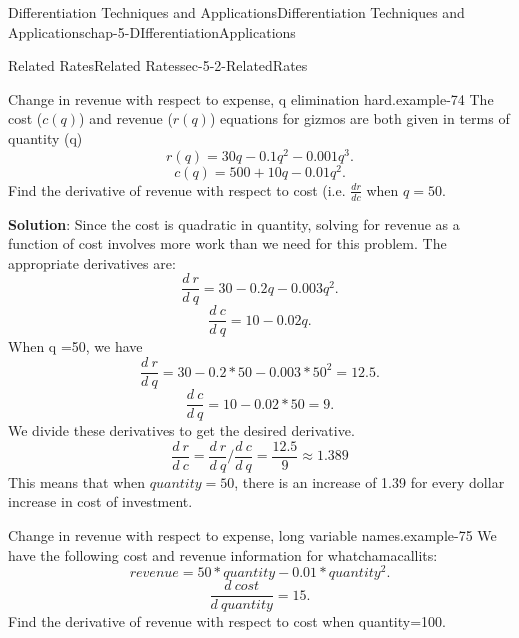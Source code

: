 \documentclass[oneside,10pt,]{book}
\newcommand{\terminology}[1]{\textbf{#1}}
\numberwithin{equation}{section}
\begin{document}
\begin{chapterptx}{Differentiation Techniques and Applications}{}{Differentiation Techniques and Applications}{}{}{chap-5-DIfferentiationApplications}
\begin{sectionptx}{Related Rates}{}{Related Rates}{}{}{sec-5-2-RelatedRates}
\begin{example}{Change in revenue with respect to expense, q elimination hard.}{example-74}
\hypertarget{p-1947}{}%
The cost (\(c(q)\)) and revenue (\(r(q)\)) equations for gizmos are both given in terms of quantity (q)%
%
\begin{equation*}
r(q)=30q-0.1 q^2-0.001 q^3.
\end{equation*}
%
\begin{equation*}
c(q)=500+10q-0.01 q^2.
\end{equation*}
\hypertarget{p-1948}{}%
Find the derivative of revenue with respect to cost (i.e. \(\frac{dr}{dc}\) when \(q=50\).%
\par
\hypertarget{p-1949}{}%
\terminology{Solution}:  Since the cost is quadratic in quantity, solving for revenue as a function of cost involves more work than we need for this problem.  The appropriate derivatives are:%
%
\begin{equation*}
\frac{d\ r}{d\ q}  =30-0.2 q-0.003 q^2.
\end{equation*}
%
\begin{equation*}
\frac{d\ c}{d\ q}=10-0.02 q.
\end{equation*}
\hypertarget{p-1950}{}%
When q =50, we have%
%
\begin{equation*}
\frac{d\ r}{d\ q}  =30-0.2*50-0.003*50^2=12.5.
\end{equation*}
%
\begin{equation*}
\frac{d\ c}{d\ q}=10-0.02*50=9.
\end{equation*}
\hypertarget{p-1951}{}%
We divide these derivatives to get the desired derivative.%
%
\begin{equation*}
\frac{d\ r}{d\ c}  =\frac{d\ r}{d\ q}/\frac{d\ c}{d\ q}
=\frac{12.5}{9}\approx 1.389
\end{equation*}
\hypertarget{p-1952}{}%
This means that when \(quantity=50\), there is an increase of \textdollar{}1.39 for every dollar increase in cost of investment.%
\end{example}
\begin{example}{Change in revenue with respect to expense, long variable names.}{example-75}%
\hypertarget{p-1953}{}%
We have the following cost and revenue information for whatchamacallits:%
%
\begin{equation*}
revenue=50*quantity-0.01*quantity^2.
\end{equation*}
%
\begin{equation*}
\frac{d\ cost}{d\ quantity}=15.
\end{equation*}
\hypertarget{p-1954}{}%
Find the derivative of revenue with respect to cost when quantity=100.%
\par

\end{example}
\end{sectionptx}
\end{chapterptx}
\end{document}
